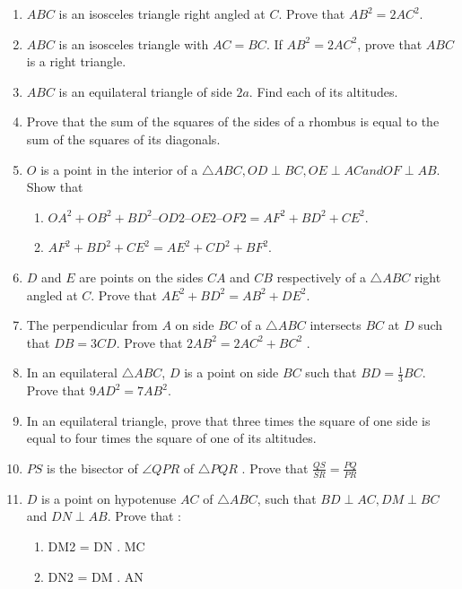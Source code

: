 \begin{enumerate}[label=\thesection.\arabic*.,ref=\thesection.\theenumi]
\begin{enumerate}
\end{enumerate}
\item  $ABC$ is an isosceles triangle right angled at $C$. Prove that $AB^2= 2 AC^2$.
 \item  $ABC$ is an isosceles triangle with $AC = BC$. If $AB^2=2 AC^2$, prove that $ABC$ is a right triangle.
\item  $ABC$ is an equilateral triangle of side $2a$. Find each of its altitudes. 
\item  Prove that the sum of the squares of the sides of a rhombus is equal to the sum of the squares of its diagonals.
\item  $O$ is a point in the interior of a $\triangle ABC, OD  \perp  BC, OE  \perp  AC and OF  \perp  AB$. Show that
%
\begin{enumerate}
\item  $OA^2 + OB^2 + BD^2 – OD2 – OE2– OF2 = AF^2 + BD^2 + CE^2$.
\item  $AF^2 + BD^2 +CE^2 = AE^2 + CD^2 + BF^2$.
\end{enumerate}
\item  $D$ and $E$ are points on the sides $CA$ and $CB$ respectively of a $\triangle ABC$ right angled at $C$. Prove that $AE^2+ BD^2 = AB^2 + DE^2$.
\item  The perpendicular from $A$ on side $BC$ of a  $\triangle  ABC$ intersects $BC$ at $D$ such that $DB = 3 CD$. Prove that $2 AB^2= 2 AC^2 + BC^2$ .
\item  In an equilateral $\triangle ABC$, $D$ is a point on side $BC$ such that $BD = \frac{1}{3} BC$.  Prove that $9 AD^2= 7 AB^2$.
\item  In an equilateral triangle, prove that three times the square of one side is equal to four times the square of one of its altitudes.
\item  $PS$ is the bisector of  $\angle  QPR$ of  $\triangle PQR$ . Prove that
$\frac{QS}{SR} = \frac{PQ}{PR}$
\item $D$ is a point on hypotenuse $AC$ of  $\triangle  ABC$, such that $BD  \perp  AC, DM  \perp  BC$ and $DN  \perp  AB$. Prove that :
\begin{enumerate}
\item  DM2 = DN . MC  
 \item  DN2 = DM . AN
\end{enumerate}


\end{enumerate}
